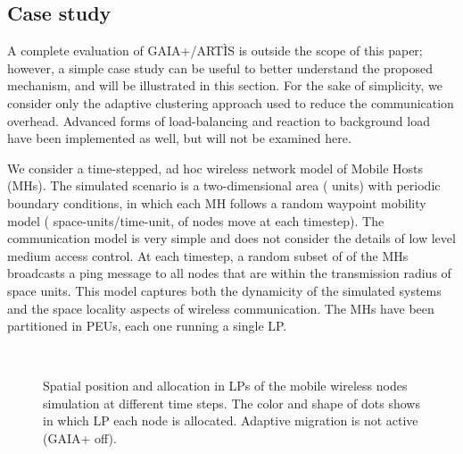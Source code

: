 \documentclass[1p]{elsarticle}
\begin{document}
\subsection{Case study}

A complete evaluation of GAIA+/ART\`IS is outside the scope of this
paper; however, a simple case study can be useful to better understand
the proposed mechanism, and will be illustrated in this section. For
the sake of simplicity, we consider only the adaptive clustering
approach used to reduce the communication overhead. Advanced forms of
load-balancing and reaction to background load have been implemented
as well, but will not be examined here.

We consider a time-stepped, ad hoc wireless network model of 
Mobile Hosts (MHs). The simulated scenario is a two-dimensional area
( units) with periodic boundary conditions, in
which each MH follows a random waypoint mobility model ( space-units/time-unit,  of nodes move at each
timestep). The communication model is very simple and does not
consider the details of low level medium access control. At each
timestep, a random subset of  of the MHs broadcasts a ping
message to all nodes that are within the transmission radius of 
space units. This model captures both the dynamicity of the simulated
systems and the space locality aspects of wireless communication. The
MHs have been partitioned in  PEUs, each one running a single LP.

\begin{figure}[!t]
\centering
{}
\\
\caption{Spatial position and allocation in LPs of the mobile wireless
  nodes simulation at different time steps. The color and shape of
  dots shows in which LP each node is allocated. Adaptive migration is
  not active (GAIA+ off).}
\label{fig_nogaia}
\end{figure}
\end{document}
